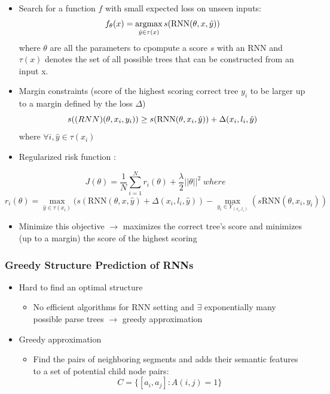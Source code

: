 \documentclass{beamer}
\newcommand{\argmax}{\operatornamewithlimits{argmax}}
\begin{document}
\frame
{
	\begin{itemize}
		\item Search for a function $ f $ with small expected loss on unseen inputs:
		$$ f_{\theta}(x) = \argmax_{\hat{y}\in\tau(x)} s(\text{RNN}(\theta, x, \hat{y}))$$
		where $\theta$ are all the parameters to cpompute a score $ s $ with an RNN and $ \tau(x) $
		denotes the set of all possible trees that can be constructed from an input x. 
		\item Margin constraints (score of the highest scoring correct tree $y_i$ 
		to be larger up to a margin defined by the loss $ \Delta $)
		$$ s(\text(RNN)(\theta, x_i, y_i)) \geq s(\text{RNN}(\theta, x_i, \hat{y})) + \Delta(x_i, l_i, \hat{y})$$
		where $\forall i, \hat{y} \in \tau(x_i)$
	\end{itemize}
}
\frame
{
	\begin{itemize}
		\item Regularized risk function :
	\end{itemize}
		$$ J(\theta) = \frac{1}{N}\sum_{i=1}^N r_i(\theta) + \frac{\lambda}{2}||\theta||^2 \; where$$
		$$ r_i(\theta) = \max_{\hat{y}\in\tau(x_i)} (s(\text{RNN}(\theta, x, \hat{y}) + \Delta(x_i, l_i, \hat{y})) - 
		\max_{y_i \in Y_{(x_i, l_i)}} (s\text{RNN}(\theta, x_i, y_i)) $$

	\begin{itemize}
		\item Minimize this objective $\rightarrow$ maximizes the correct tree's score and minimizes (up to a margin) 
		the score of the highest scoring 
	\end{itemize}
}
\frame
{
	\frametitle{Greedy Structure Prediction of RNNs}
	\begin{itemize}
		\item Hard to find an optimal structure 
		\begin{itemize}
		\item No efficient algorithms for RNN setting and $\exists$ exponentially 
		many possible parse trees $\rightarrow$ greedy approximation
		\end{itemize}
		\item Greedy approximation 
		\begin{itemize}
		\item Find the pairs of neighboring segments and adds their semantic features to a set of potential child node pairs:
		$$ C = \{[a_i, a_j]: A(i,j) = 1\} $$
		\end{itemize}
	\end{itemize}
}
\frame
\end{document}
